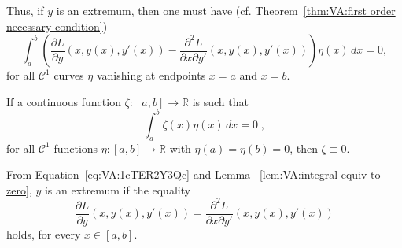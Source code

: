 Thus, if $y$ is an extremum, then one must have (cf. 
Theorem~\ref{thm:VA:first order necessary condition})
\begin{equation}\label{eq:VA:1cTER2Y3Qc}
	\int_a^b\left(\dfrac{\partial L}{\partial y}(x,
	y(x),y'(x))-\dfrac{\partial^2 L}{\partial x\partial y'}(x,
	y(x),y'(x))\right)\eta(x)\,dx=0,
\end{equation}
for all $\mathcal{C}^1$ curves $\eta$ vanishing at endpoints $x=a$ and 
$x=b$.

\begin{lemma}\label{lem:VA:integral equiv to zero}
	If a continuous function $\zeta:[a,b]\to\mathbb{R}$ is such that
	\[\int_a^b \zeta(x)\eta(x)\,dx=0\;,\]
	for all $\mathcal{C}^1$ functions $\eta:[a,b]\to\mathbb{R}$ with 
	$\eta(a)=\eta(b)=0$, then $\zeta\equiv0$.
\end{lemma}

From Equation~\eqref{eq:VA:1cTER2Y3Qc} and Lemma~
\eqref{lem:VA:integral equiv to zero}, $y$ is an extremum if the equality
\begin{equation}
	\dfrac{\partial L}{\partial y}(x,
	y(x),y'(x))=\dfrac{\partial^2 L}{\partial x\partial y'}(x,
	y(x),y'(x))
\end{equation}
holds, for every $x\in[a,b]$.